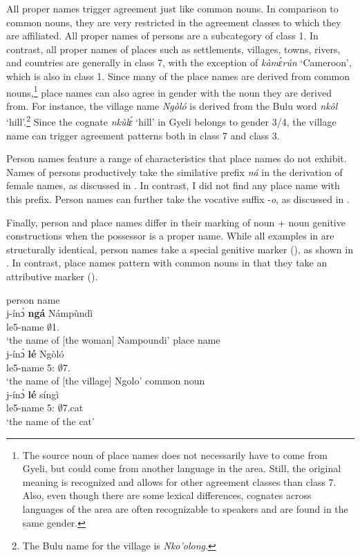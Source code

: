All proper names trigger agreement just like common nouns. In comparison to common nouns, they are very restricted in the agreement classes to which they are affiliated. 
All proper names of persons are a subcategory of class 1. In contrast, all proper names of places such as settlements, villages, towns, rivers, and countries are generally in class 7, with the exception of {\itshape kàmɛ̀rún} `Cameroon', which is also in class 1. Since many of the place names are derived from common nouns,\footnote{The source noun of place names does not necessarily have to come from Gyeli, but could come from another language in the area. Still, the original meaning is recognized and allows for other agreement classes than class 7. Also, even though there are some lexical differences, cognates across languages of the area are often recognizable to speakers and are found in the same gender.}  place names can also agree in gender with the noun they are derived from. For instance,  the village name {\itshape Ngòló} is derived from the Bulu word {\itshape nkôl} `hill'.\footnote{The Bulu name for the village is  {\itshape Nko'olong}.}  %
Since the cognate {\itshape nkùlɛ́ }`hill' in Gyeli belongs to gender 3/4, the village name can trigger agreement patterns both in class 7 and class 3.

Person names feature a range of characteristics that place names do not exhibit. Names of persons productively take the similative prefix {\itshape ná} in the derivation of female names, as discussed in . In contrast, I did not find any place name with this prefix. 
Person names can further take the vocative suffix -{\itshape o}, as discussed in . 

Finally, person and place names differ in their marking of noun + noun genitive constructions when the possessor is a proper name. While all examples in  are structurally identical, person names take a special genitive marker (), as shown in . In contrast, place names  pattern with common nouns  in that they take an attributive marker ().


\ea \label{GenAtt}
  \ea \label{GenAtt1} person name\\
\gll  j-ínɔ̀ {\bfseries ngá} Námpùndì \\
	le5-name {\GEN} $\emptyset$1.{\PN} \\
 \trans `the name of [the woman] Nampoundi'
\ex\label{GenAtt2} place name\\
\gll j-ínɔ̀ {\bfseries lé} Ngòló \\
    le5-name 5:{\ATT} $\emptyset$7.{\PN}	\\
 \trans `the name of [the village] Ngolo'
\ex\label{GenAtt3} common noun\\
\gll  j-ínɔ̀ {\bfseries lé} síngì \\
	le5-name 5:{\ATT} $\emptyset$7.cat \\
 \trans `the name of the cat'
\z
\z




